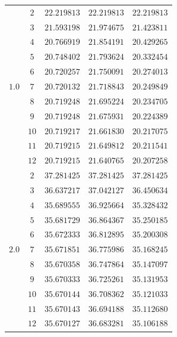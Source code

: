 \documentclass[
    a4paper, aps, twocolumn, floatfix, superscriptaddress,
    nofootinbib]{revtex4-1}
\newcommand{\1}{\mathds{1}}
\begin{document}
\begin{table}
\begin{ruledtabular}
\begin{tabular}{c|c|ccc}
                             &  $2$  & $22.219813$ & $22.219813$ & $22.219813$ \\
                             &  $3$  & $21.593198$ & $21.974675$ & $21.423811$ \\
                             &  $4$  & $20.766919$ & $21.854191$ & $20.429265$ \\
                             &  $5$  & $20.748402$ & $21.793624$ & $20.332454$ \\
                             &  $6$  & $20.720257$ & $21.750091$ & $20.274013$ \\
                      $1.0$  &  $7$  & $20.720132$ & $21.718843$ & $20.249849$ \\
                             &  $8$  & $20.719248$ & $21.695224$ & $20.234705$ \\
                             &  $9$  & $20.719248$ & $21.675931$ & $20.224389$ \\
                             &  $10$ & $20.719217$ & $21.661830$ & $20.217075$ \\
                             &  $11$ & $20.719215$ & $21.649812$ & $20.211541$ \\
                             &  $12$ & $20.719215$ & $21.640765$ & $20.207258$ \\
                             \hline

                             &  $2$  & $37.281425$ & $37.281425$ & $37.281425$ \\
                             &  $3$  & $36.637217$ & $37.042127$ & $36.450634$ \\
                             &  $4$  & $35.689555$ & $36.925664$ & $35.328432$ \\
                             &  $5$  & $35.681729$ & $36.864367$ & $35.250185$ \\
                             &  $6$  & $35.672333$ & $36.812895$ & $35.200308$ \\
                      $2.0$  &  $7$  & $35.671851$ & $36.775986$ & $35.168245$ \\
                             &  $8$  & $35.670358$ & $36.747864$ & $35.147097$ \\
                             &  $9$  & $35.670333$ & $36.725261$ & $35.131953$ \\
                             &  $10$ & $35.670144$ & $36.708362$ & $35.121033$ \\
                             &  $11$ & $35.670143$ & $36.694188$ & $35.112680$ \\
                             &  $12$ & $35.670127$ & $36.683281$ & $35.106188$
                \end{tabular}
            \end{ruledtabular}
            \label{tab:N6}
        \end{table}
\end{document}
